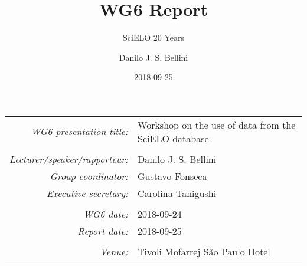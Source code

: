 \documentclass[utf8]{beamer}
\title{WG6 Report}
\subtitle{SciELO 20 Years}
\date{2018-09-25}
\author{Danilo J. S. Bellini}
\begin{document}
\begin{frame}
  \vfill
  \begin{tabu} to \textwidth {rX}
    \emph{WG6 presentation title:} &
      Workshop on the use of data from the SciELO database \\
    \\
    \emph{Lecturer/speaker/rapporteur:} &
      Danilo J. S. Bellini \\
    \emph{Group coordinator:} &
      Gustavo Fonseca \\
    \emph{Executive secretary:} &
      Carolina Tanigushi \\
    \\
    \emph{WG6 date:} &
      2018-09-24 \\
    \emph{Report date:} &
      2018-09-25 \\
    \\
    \emph{Venue:} &
      Tivoli Mofarrej São Paulo Hotel \\
  \end{tabu}
\end{frame}
\end{document}
